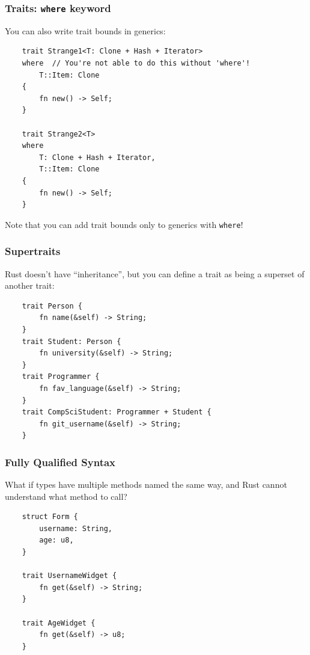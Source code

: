 \documentclass[aspectratio=1610,t]{beamer}
\begin{document}

\begin{frame}[fragile]
\frametitle{Traits: \texttt{where} keyword}
You can also write trait bounds in generics:

\begin{verbatim}
    trait Strange1<T: Clone + Hash + Iterator> 
    where  // You're not able to do this without 'where'!
        T::Item: Clone
    {
        fn new() -> Self;
    }

    trait Strange2<T> 
    where
        T: Clone + Hash + Iterator,
        T::Item: Clone
    {
        fn new() -> Self;
    }
\end{verbatim}

Note that you can add trait bounds only to generics with \texttt{where}!
\end{frame}


\begin{frame}[fragile]
\frametitle{Supertraits}
Rust doesn't have ``inheritance'', but you can define a trait as being a superset of another trait:

\begin{verbatim}
    trait Person {
        fn name(&self) -> String;
    }
    trait Student: Person {
        fn university(&self) -> String;
    }
    trait Programmer {
        fn fav_language(&self) -> String;
    }
    trait CompSciStudent: Programmer + Student {
        fn git_username(&self) -> String;
    }
\end{verbatim}
\end{frame}


\begin{frame}[fragile]
\frametitle{Fully Qualified Syntax}
What if types have multiple methods named the same way, and Rust cannot understand what method to call?

\begin{verbatim}
    struct Form {
        username: String,
        age: u8,
    }

    trait UsernameWidget {
        fn get(&self) -> String;
    }

    trait AgeWidget {
        fn get(&self) -> u8;
    }
\end{verbatim}
\end{frame}
\end{document}
